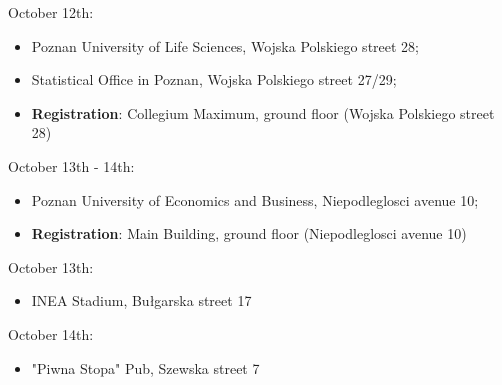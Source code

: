 October 12th:

\begin{itemize}
        \item Poznan University of Life Sciences, Wojska Polskiego street 28;
        \item Statistical Office in Poznan, Wojska Polskiego street 27/29;
        \item \textbf{Registration}: Collegium Maximum, ground floor (Wojska Polskiego street 28)
\end{itemize}

October 13th - 14th:

\begin{itemize}
        \item Poznan University of Economics and Business, Niepodleglosci avenue 10;
        \item \textbf{Registration}: Main Building, ground floor (Niepodleglosci avenue 10)
\end{itemize}

October 13th:

\begin{itemize}
        \item INEA Stadium, Bułgarska street 17
\end{itemize}

October 14th: 

\begin{itemize}
        \item "Piwna Stopa" Pub, Szewska street 7
\end{itemize}
